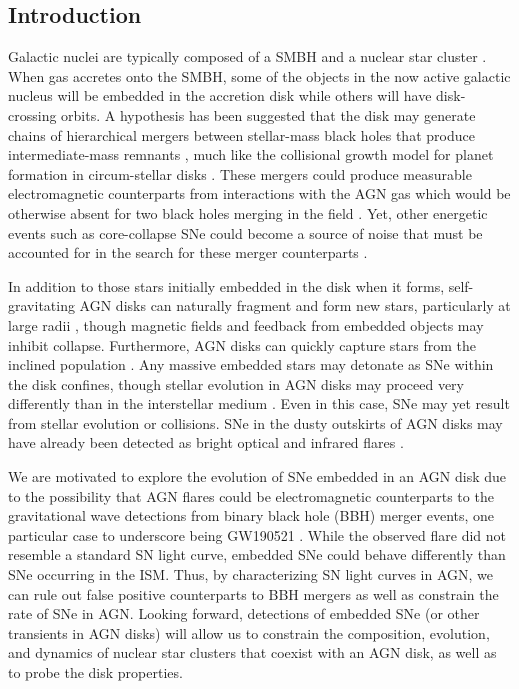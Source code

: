 \subsection{Introduction} 
\label{sec:intro-ch3}

Galactic nuclei are typically composed of a SMBH and a nuclear star cluster \citep{Ghez+98,Ghez+08}.
When gas accretes onto the SMBH, some of the objects in the now active galactic nucleus will be embedded in the accretion disk while others will have disk-crossing orbits.
A hypothesis has been suggested that the disk may generate chains of hierarchical mergers between stellar-mass black holes that produce intermediate-mass remnants \citep{McKernan+14, Bartos+17, Stone+17, FordMcKernan25, Abbott+20-GW190521, LVK+25-GW231123}, much like the collisional growth model for planet formation in circum-stellar disks \citep{Pollack+96}.
These mergers could produce measurable electromagnetic counterparts from interactions with the AGN gas which would be otherwise absent for two black holes merging in the field \citep{McKernan+19}.
Yet, other energetic events such as core-collapse SNe could become a source of noise that must be accounted for in the search for these merger counterparts \citep{Graham+20}.

In addition to those stars initially embedded in the disk when it forms, self-gravitating AGN disks can naturally fragment and form new stars, particularly at large radii \citep{ShlosmanBegelman89, CollinZahn08}, though magnetic fields \citep{Gerling-Dunsmore+25, Tsung+25} and feedback from embedded objects \citep{HanklaJiangArmitage20} may inhibit collapse.
Furthermore, AGN disks can quickly capture stars from the inclined population \citep{Fabj+20,MacLeodLin20}.
Any massive embedded stars may detonate as SNe within the disk confines, though stellar evolution in AGN disks may proceed very differently than in the interstellar medium \citep[ISM,][]{CantielloJermynLin21}.
Even in this case, SNe may yet result from stellar evolution \citep{Jermyn+21} or collisions.
SNe in the dusty outskirts of AGN disks may have already been detected as bright optical and infrared flares \citep[e.g.][]{Assef+18}.

We are motivated to explore the evolution of SNe embedded in an AGN disk due to the possibility that AGN flares could be electromagnetic counterparts to the gravitational wave detections from binary black hole (BBH) merger events, one particular case to underscore being GW190521 \citet{Abbott+20-GW190521}.
While the observed flare \citep{Graham+20} did not resemble a standard SN light curve, embedded SNe could behave differently than SNe occurring in the ISM. 
Thus, by characterizing SN light curves in AGN, we can rule out false positive counterparts to BBH mergers as well as constrain the rate of SNe in AGN. 
Looking forward, detections of embedded SNe (or other transients in AGN disks) will allow us to constrain the composition, evolution, and dynamics of nuclear star clusters that coexist with an AGN disk, as well as to probe the disk properties.


